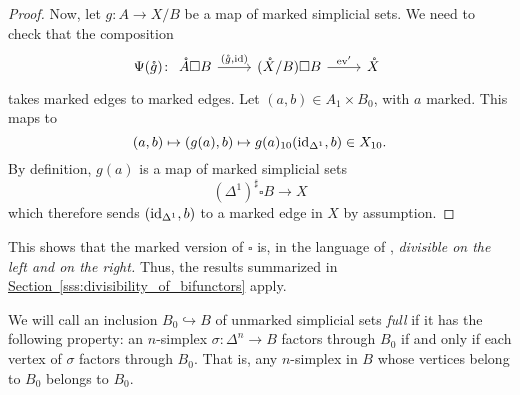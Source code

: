 \documentclass[main.tex]{subfiles}
\begin{document}
\begin{proof}
  Now, let $g\colon A \to X / B$ be a map of marked simplicial sets. We need to check that the composition
  \begin{equation*}
    \Psi(\mathring{g})\colon 
    \begin{tikzcd}
      \mathring{A} \square B
      \arrow[r, "{(\mathring{g}, \id)}"]
      & (\mathring{X} / B) \square B
      \arrow[r, "\ev'"]
      & \mathring{X}
    \end{tikzcd}
  \end{equation*}
  takes marked edges to marked edges. Let $(a, b) \in A_{1} \times B_{0}$, with $a$ marked. This maps to
  \begin{equation*}
    (a, b) \mapsto (g(a), b) \mapsto g(a)_{10}(\mathrm{id}_{\Delta^{1}}, b) \in X_{10}.
  \end{equation*}
  By definition, $g(a)$ is a map of marked simplicial sets
  \begin{equation*}
    (\Delta^{1})^{\sharp} \square B \to X
  \end{equation*}
  which therefore sends $(\mathrm{id}_{\Delta^{1}}, b)$ to a marked edge in $X$ by assumption.
\end{proof}

This shows that the marked version of $\square$ is, in the language of \cite{qcats_vs_segal_spaces}, \emph{divisible on the left and on the right.} Thus, the results summarized in \hyperref[sss:divisibility_of_bifunctors]{Section~\ref*{sss:divisibility_of_bifunctors}} apply.

We will call an inclusion $B_{0} \hookrightarrow B$ of unmarked simplicial sets \emph{full} if it has the following property: an $n$-simplex $\sigma\colon \Delta^{n} \to B$ factors through $B_{0}$ if and only if each vertex of $\sigma$ factors through $B_{0}$. That is, any $n$-simplex in $B$ whose vertices belong to $B_{0}$ belongs to $B_{0}$.
\end{document}
